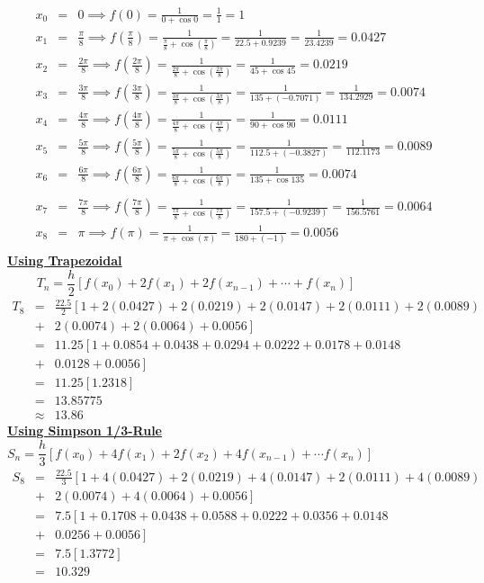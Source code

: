 \documentclass[12pt]{report}
\newcommand{\ubt}[1]{\textbf{\underline{#1}}}
\newcommand{\spn}[1]{\\[#1cm]}
\begin{document}
	\begin{eqnarray*}
		x_0 &=& 0 \implies f(0) = \frac{1}{0 + \cos 0} = \frac{1}{1} = 1\spn{0.3}
		x_1 &=& \frac{\pi}{8} \implies f\left(\frac{\pi}{8}\right) = \frac{1}{\frac{\pi}{8} + \cos \left(\frac{\pi}{8}\right)} = \frac{1}{22.5 + 0.9239} = \frac{1}{23.4239} = 0.0427\spn{0.5}
		x_2 &=& \frac{2\pi}{8} \implies f\left(\frac{2\pi}{8}\right) = \frac{1}{\frac{2\pi}{8} + \cos \left(\frac{2\pi}{8}\right)} = \frac{1}{45 + \cos 45} = 0.0219\spn{0.5}
		x_3 &=& \frac{3\pi}{8} \implies f\left(\frac{3\pi}{8}\right) = \frac{1}{\frac{3\pi}{8} + \cos \left(\frac{3\pi}{8}\right)} = \frac{1}{135 + (-0.7071)} = \frac{1}{134.2929} = 0.0074\spn{0.5}
		x_4 &=& \frac{4\pi}{8} \implies f\left(\frac{4\pi}{8}\right) = \frac{1}{\frac{4\pi}{8} + \cos \left(\frac{4\pi}{8}\right)} = \frac{1}{90 + \cos 90} = 0.0111\spn{0.5}
		x_5 &=& \frac{5\pi}{8} \implies f\left(\frac{5\pi}{8}\right) = \frac{1}{\frac{5\pi}{8} + \cos \left(\frac{5\pi}{8}\right)} = \frac{1}{112.5 + (-0.3827)} = \frac{1}{112.1173} =  0.0089\spn{0.5}
		x_6 &=& \frac{6\pi}{8} \implies f\left(\frac{6\pi}{8}\right) = \frac{1}{\frac{6\pi}{8} + \cos \left(\frac{6\pi}{8}\right)} = \frac{1}{135 + \cos 135} = 0.0074\spn{0.5}
	\end{eqnarray*}
	\newpage
	\begin{eqnarray*}
		x_7 &=& \frac{7\pi}{8} \implies f\left(\frac{7\pi}{8}\right) = \frac{1}{\frac{7\pi}{8} + \cos \left(\frac{7\pi}{8}\right)} = \frac{1}{157.5 + (-0.9239)} = \frac{1}{156.5761} =  0.0064\spn{0.5}
		x_8 &=& \pi \implies f\left(\pi\right) = \frac{1}{\pi + \cos \left(\pi\right)} = \frac{1}{180 + (-1)} = 0.0056\spn{0.5}
	\end{eqnarray*}
	\ubt{Using Trapezoidal}
	\begin{equation*}
		T_n = \frac{h}{2}\left[f(x_0) + 2f(x_1) + 2f(x_{n-1}) + \cdots + f(x_n)\right]\qquad\qquad\qquad
	\end{equation*}
	\begin{eqnarray*}
		T_8 &=& \frac{22.5}{2}\left[1 + 2(0.0427) + 2(0.0219) + 2(0.0147) + 2(0.0111) + 2(0.0089) \right.\\ 
		&+&\left. 2(0.0074) + 2(0.0064) + 0.0056\right]\spn{0.5}
		&=& 11.25\left[1 + 0.0854 + 0.0438 + 0.0294 + 0.0222 + 0.0178 + 0.0148 \right.\\ 
		&+&\left. 0.0128 + 0.0056 \right]\spn{0.2}
		&=& 11.25[1.2318]\spn{0.1}
		&=&13.85775\spn{0.1}
		&\approx& 13.86
	\end{eqnarray*}
		\ubt{Using Simpson 1/3-Rule}
	\begin{equation*}
		S_n = \frac{h}{3}\left[f(x_0) + 4f(x_1) + 2f(x_2) + 4f(x_{n-1}) + \cdots f(x_n)\right]\qquad\qquad\qquad\qquad\qquad
	\end{equation*}
	\begin{eqnarray*}
		S_8 &=& \frac{22.5}{3}\left[1 + 4(0.0427) + 2(0.0219) + 4(0.0147) + 2(0.0111) + 4(0.0089) \right.\\ 
		&+&\left. 2(0.0074) + 4(0.0064) + 0.0056\right]\spn{0.5}
		&=& 7.5\left[1 + 0.1708 + 0.0438 + 0.0588 + 0.0222 + 0.0356 + 0.0148 \right.\\ 
		&+&\left. 0.0256 + 0.0056 \right]\spn{0.2}
		&=& 7.5[1.3772]\spn{0.1}
		&=&10.329\spn{0.1}
	\end{eqnarray*}
\end{document}
